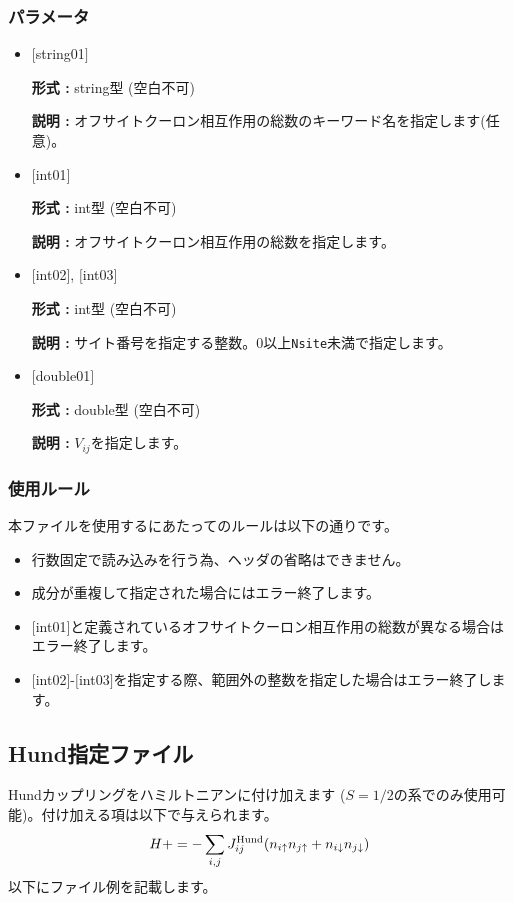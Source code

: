 \subsubsection{パラメータ}
 \begin{itemize}

   \item  $[$string01$]$
   
    {\bf 形式 :} string型 (空白不可)

   {\bf 説明 :} オフサイトクーロン相互作用の総数のキーワード名を指定します(任意)。

   \item  $[$int01$]$
   
    {\bf 形式 :} int型 (空白不可)

   {\bf 説明 :} オフサイトクーロン相互作用の総数を指定します。

  \item  $[$int02$]$, $[$int03$]$
  
 {\bf 形式 :} int型 (空白不可)

{\bf 説明 :} サイト番号を指定する整数。0以上\verb|Nsite|{未満}で指定します。
 
 \item  $[$double01$]$
   
   {\bf 形式 :} double型 (空白不可)

  {\bf 説明 :}  $V_{ij}$を指定します。
  
\end{itemize}

\subsubsection{使用ルール}
本ファイルを使用するにあたってのルールは以下の通りです。
\begin{itemize}
\item 行数固定で読み込みを行う為、ヘッダの省略はできません。
\item 成分が重複して指定された場合にはエラー終了します。
\item $[$int01$]$と定義されているオフサイトクーロン相互作用の総数が異なる場合はエラー終了します。
\item $[$int02$]$-$[$int03$]$を指定する際、範囲外の整数を指定した場合はエラー終了します。
\end{itemize}

\newpage
\subsection{Hund指定ファイル}
Hundカップリングをハミルトニアンに付け加えます{ ($S=1/2$の系でのみ使用可能)}。付け加える項は以下で与えられます。
\begin{equation}
H+=-\sum_{i,j}J_{ij}^{\rm Hund} (n_{i\uparrow}n_{j\uparrow}+n_{i\downarrow}n_{j\downarrow})
\end{equation}
以下にファイル例を記載します。

